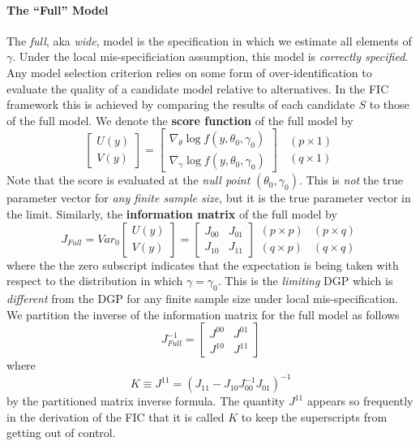\paragraph{The ``Full'' Model} The \emph{full}, aka \emph{wide}, model is the specification in which we estimate all elements of $\gamma$. 
Under the local mis-specificiation assumption, this model is \emph{correctly specified}. 
Any model selection criterion relies on some form of over-identification to evaluate the quality of a candidate model relative to alternatives. 
In the FIC framework this is achieved by comparing the results of each candidate $S$ to those of the full model. 
We denote the \textbf{score function} of the full model by
$$\left[\begin{array}{c}
U(y)\\
V(y)
\end{array} \right] = \left[\begin{array}{c}
\nabla_\theta \log{f(y, \theta_0, \gamma_0)}\\
\nabla_\gamma \log{f(y, \theta_0, \gamma_0)}
\end{array}\right]\;\;\begin{array}{c}
(p\times 1)\\
(q\times 1)
\end{array}$$
Note that the score is evaluated at the \emph{null point} $(\theta_0, \gamma_0)$. 
This is \emph{not} the true parameter vector for \emph{any finite sample size}, but it is the true parameter vector in the limit. 
Similarly, the \textbf{information matrix} of the full model by
$$J_{Full} = Var_0\left[\begin{array}{c}
U(y)\\
V(y)
\end{array}\right]=\left[\begin{array}{cc}
J_{00} & J_{01}\\
J_{10} & J_{11}

\end{array}\right]\begin{array}
{cc} (p\times p) & (p\times q) \\
(q\times p) & (q\times q)
\end{array}$$
where the the zero subscript indicates that the expectation is being taken with respect to the distribution in which $\gamma = \gamma_0$. 
This is the \emph{limiting} DGP which is \emph{different} from the DGP for any finite sample size under local mis-specification. 
We partition the inverse of the information matrix for the full model as follows
$$J_{Full}^{-1} = \left[\begin{array}{cc}
J^{00} & J^{01}\\
J^{10} & J^{11}
\end{array}\right]$$
where
$$K \equiv J^{11} = (J_{11} - J_{10}J_{00}^{-1}J_{01})^{-1}$$
by the partitioned matrix inverse formula. 
The quantity $J^{11}$ appears so frequently in the derivation of the FIC that it is called $K$ to keep the superscripts from getting out of control.

